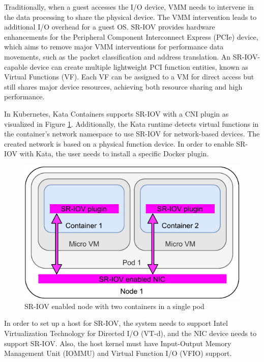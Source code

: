 Traditionally, when a guest accesses the I/O device, VMM needs to intervene in the data processing to share the physical device. The VMM intervention leads to additional I/O overhead for a guest OS. SR-IOV provides hardware enhancements for the Peripheral Component Interconnect Express (PCIe) device, which aims to remove major VMM interventions for performance data movements, such as the packet classification and address translation. An SR-IOV-capable device can create multiple lightweight PCI function entities, known as Virtual Functions (VF). Each VF can be assigned to a VM for direct access but still shares major device resources, achieving both resource sharing and high performance. \cite{Dong2012}

In Kubernetes, Kata Containers supports SR-IOV with a CNI plugin \cite{SR-IOVOpenShift} as visualized in Figure \ref{fig:SR-IOVNode}. Additionally, the Kata runtime detects virtual functions in the container's network namespace to use SR-IOV for network-based devices. The created network is based on a physical function device. In order to enable SR-IOV with Kata, the user needs to install a specific Docker plugin. \cite{SR-IOVKataContainers}

\begin{figure}[ht]
  \begin{center}
    \includegraphics[width=13.5cm]{images/SR-IOVNode.pdf}
    \caption{SR-IOV enabled node with two containers in a single pod}
    \label{fig:SR-IOVNode}
  \end{center}
\end{figure}

In order to set up a host for SR-IOV, the system needs to support Intel Virtualization Technology for Directed I/O (VT-d), and the NIC device needs to support SR-IOV. Also, the host kernel must have Input-Output Memory Management Unit (IOMMU) and Virtual Function I/O (VFIO) support.

